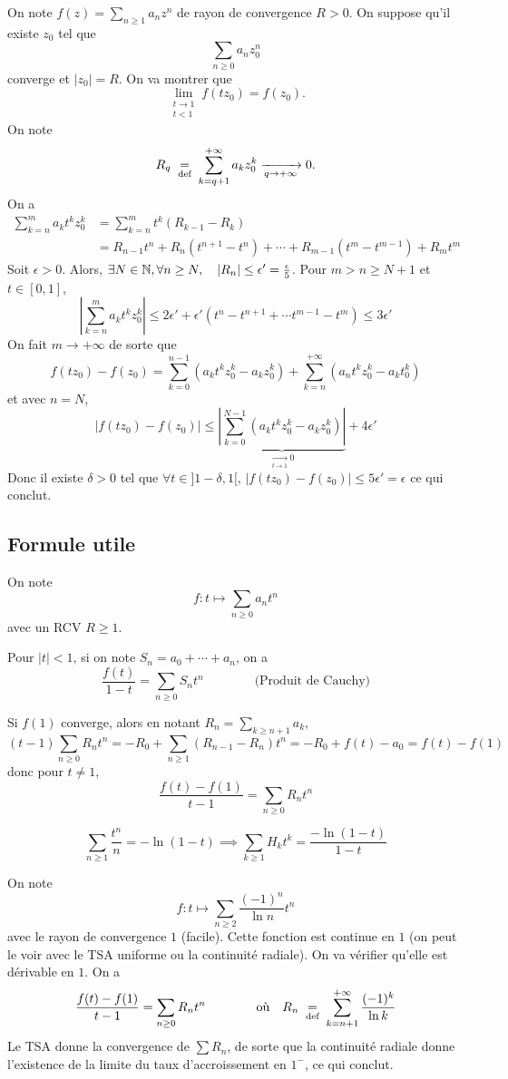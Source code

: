 On note $f(z)=\sum_{n\geq 1}a_nz^n$ de rayon de convergence $R>0$. On suppose qu'il existe $z_0$ tel que \[
    \sum_{n\geq 0}a_nz_0^n
\]
converge et $|z_0|=R$. On va montrer que \[
    \lim_{\substack{t\to1\\t<1}}f(tz_0)=f(z_0).
\]
On note \[
    R_q\;\underset{\text{def}}=\; \sum_{k=q+1}^{+\infty}a_kz_0^k\xrightarrow[q\to+\infty]{}0.
\]
On a \begin{align*}
    \sum_{k=n}^ma_kt^kz_0^k&=\sum_{k=n}^mt^k(R_{k-1}-R_k)\\&=R_{n-1}t^n+R_n(t^{n+1}-t^n)+\cdots +R_{m-1}(t^m-t^{m-1})+R_mt^m
\end{align*}
Soit $\epsilon>0$. Alors, $\exists N\in\mathbb N, \forall n\geq N, \quad |R_n|\leq \epsilon'=\frac\epsilon5$.
Pour $m>n\geq N+1$ et $t\in[0, 1]$, \[
    \left| \sum_{k=n}^ma_kt^kz_0^k \right|\leq 2\epsilon' + \epsilon'(t^n-t^{n+1}+\cdots t^{m-1}-t^m)\leq 3\epsilon'
\]
On fait $m\longrightarrow +\infty$ de sorte que \[
    f(tz_0)-f(z_0)=\sum_{k=0}^{n-1}(a_kt^kz_0^k-a_kz_0^k)+\sum_{k=n}^{+\infty}(a_nt^kz_0^k-a_kt_0^k)
\]
et avec $n=N$, \[
    \left| f(tz_0)-f(z_0) \right|\leq \underbrace{\left| \sum_{k=0}^{N-1}(a_kt^kz_0^k-a_kz_0^k) \right|}_{\displaystyle \xrightarrow[t\to 1]{}0}+4\epsilon'
\]
Donc il existe $\delta>0$ tel que $\forall t\in ]1-\delta, 1[$, $|f(tz_0)-f(z_0)|\leq 5\epsilon'=\epsilon$ ce qui conclut.

\subsection{Formule utile}

On note \[
    f:t\longmapsto \sum_{n\geq 0}a_nt^n
\]
avec un RCV $R\geq 1$.

Pour $|t|<1$, si on note $S_n=a_0+\cdots +a_n$, on a \[
    \frac{f(t)}{1-t}=\sum_{n\geq 0}S_nt^n\qquad \qquad \text{(Produit de Cauchy)}
\]

Si $f(1)$ converge, alors en notant $R_n=\sum_{k\geq n+1}a_k$, \[
    (t-1)\sum_{n\geq 0}R_nt^n=-R_0+\sum_{n\geq 1}(R_{n-1}-R_n)t^n=-R_0+f(t)-a_0=f(t)-f(1)
\]
donc pour $t\neq 1$, \[
    \frac{f(t)-f(1)}{t-1}=\sum_{n\geq 0}R_nt^n
\]

\begin{ex}
    \[
        \sum_{n\geq 1}\frac{t^n}n=-\ln(1-t)\implies \sum_{k\geq 1}H_kt^k=\frac{-\ln(1-t)}{1-t}
    \]
\end{ex}

\begin{ex}
    On note \[
        f:t\longmapsto \sum_{n\geq 2}\frac{(-1)^n}{\ln n}t^n
    \]
    avec le rayon de convergence $1$ (facile). Cette fonction est continue en $1$ (on peut le voir avec le TSA uniforme ou la continuité radiale). On va vérifier qu'elle est dérivable en $1$. On a \[
        \frac{f(t)-f(1)}{t-1}=\sum_{n\geq 0}R_nt^n\qquad \qquad \text{où}\quad R_n\;\underset{\text{def}}=\;\sum_{k=n+1}^{+\infty}\frac{(-1)^k}{\ln k}
    \]
    Le TSA donne la convergence de $\sum R_n$, de sorte que la continuité radiale donne l'existence de la limite du taux d'accroissement en $1^-$, ce qui conclut.
\end{ex}

